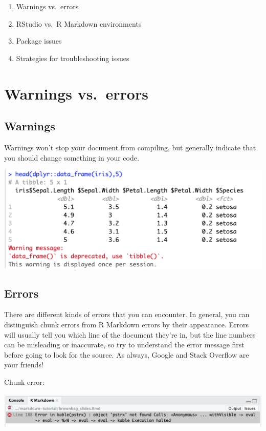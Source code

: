 \documentclass[
]{book}
\providecommand{\tightlist}{%
  \setlength{\itemsep}{0pt}\setlength{\parskip}{0pt}}
\begin{document}
\begin{enumerate}
\def\labelenumi{\arabic{enumi}.}
\tightlist
\item
  Warnings vs.~errors
\item
  RStudio vs.~R Markdown environments
\item
  Package issues
\item
  Strategies for troubleshooting issues
\end{enumerate}

\hypertarget{warnings-vs.-errors}{%
\section{Warnings vs.~errors}\label{warnings-vs.-errors}}

\hypertarget{warnings}{%
\subsection{Warnings}\label{warnings}}

Warnings won't stop your document from compiling, but generally indicate that you should change something in your code.

\includegraphics[width=14.92in]{images/warning_example}

\hypertarget{errors}{%
\subsection{Errors}\label{errors}}

There are different kinds of errors that you can encounter. In general, you can distinguish chunk errors from R Markdown errors by their appearance. Errors will usually tell you which line of the document they're in, but the line numbers can be misleading or inaccurate, so try to understand the error message first before going to look for the source. As always, Google and Stack Overflow are your friends!

Chunk error:

\includegraphics[width=21.31in]{images/error_example}
\end{document}

